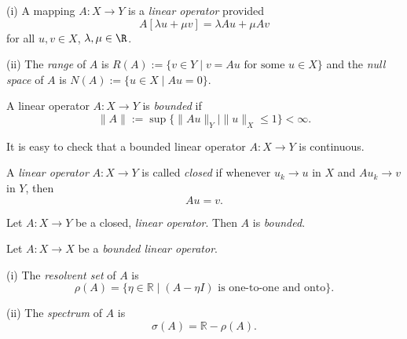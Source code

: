 \begin{definition}
\label{def:linear-operator-banach}
(i) A mapping $A : X \to Y$ is a \textit{linear operator} provided
$$A[\lambda u + \mu v] = \lambda Au + \mu Av$$
for all $u, v \in X$, $\lambda, \mu \in \R$.

(ii) The \textit{range} of $A$ is $R(A) := \{v \in Y \mid v = Au \text{ for some } u \in X\}$ and the \textit{null space} of $A$ is $N(A) := \{u \in X \mid Au = 0\}$.
\end{definition}

\begin{definition}
\label{def:bounded-linear-operator}
A linear operator $A : X \to Y$ is \textit{bounded} if
$$\|A\| := \sup\{\|Au\|_Y \mid \|u\|_X \leq 1\} < \infty.$$
\end{definition}

It is easy to check that a bounded linear operator $A : X \to Y$ is continuous.

\begin{definition}
\label{def:closed-linear-operator}
A \textit{linear operator} $A : X \to Y$ is called \textit{closed} if whenever $u_k \to u$ in $X$ and $Au_k \to v$ in $Y$, then
$$Au = v.$$
\end{definition}

\begin{theorem}
\label{thm:closed-graph-theorem}
Let $A : X \to Y$ be a closed, \textit{linear operator}. Then $A$ is \textit{bounded}.
\end{theorem}

\begin{definition}
\label{def:resolvent-set-spectrum-appendix-d}
Let $A : X \to X$ be a \textit{bounded linear operator}.

(i) The \textit{resolvent set} of $A$ is
$$\rho(A) = \{\eta \in \mathbb{R} \mid (A - \eta I) \text{ is one-to-one and onto}\}.$$

(ii) The \textit{spectrum} of $A$ is
$$\sigma(A) = \mathbb{R} - \rho(A).$$
\end{definition}

